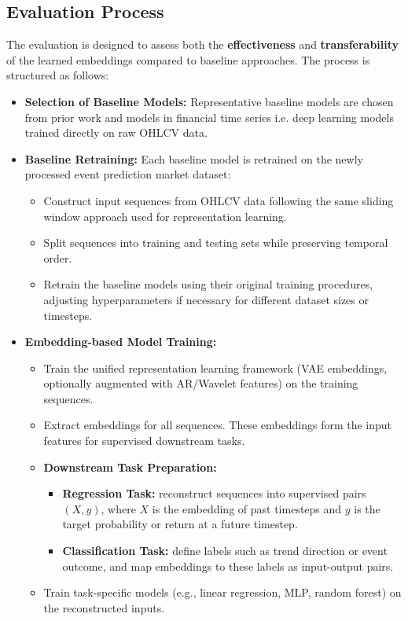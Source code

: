 \subsection*{Evaluation Process}

The evaluation is designed to assess both the \textbf{effectiveness} and \textbf{transferability} of the learned embeddings compared to baseline approaches. The process is structured as follows:

\begin{itemize}[noitemsep]
    \item \textbf{Selection of Baseline Models:}  
    Representative baseline models are chosen from prior work and models in financial time series i.e. deep learning models trained directly on raw OHLCV data.

    \item \textbf{Baseline Retraining:}  
    Each baseline model is retrained on the newly processed event prediction market dataset:
    \begin{itemize}[noitemsep]
        \item Construct input sequences from OHLCV data following the same sliding window approach used for representation learning.
        \item Split sequences into training and testing sets while preserving temporal order.
        \item Retrain the baseline models using their original training procedures, adjusting hyperparameters if necessary for different dataset sizes or timesteps.
    \end{itemize}

    \item \textbf{Embedding-based Model Training:}  
    \begin{itemize}[noitemsep]
        \item Train the unified representation learning framework (VAE embeddings, optionally augmented with AR/Wavelet features) on the training sequences.
        \item Extract embeddings for all sequences. These embeddings form the input features for supervised downstream tasks.
        \item \textbf{Downstream Task Preparation:} 
        \begin{itemize}[noitemsep]
            \item \textbf{Regression Task:} reconstruct sequences into supervised pairs $(X, y)$, where $X$ is the embedding of past timesteps and $y$ is the target probability or return at a future timestep.
            \item \textbf{Classification Task:} define labels such as trend direction or event outcome, and map embeddings to these labels as input-output pairs.
        \end{itemize}
        \item Train task-specific models (e.g., linear regression, MLP, random forest) on the reconstructed inputs.
    \end{itemize}


\end{itemize}
